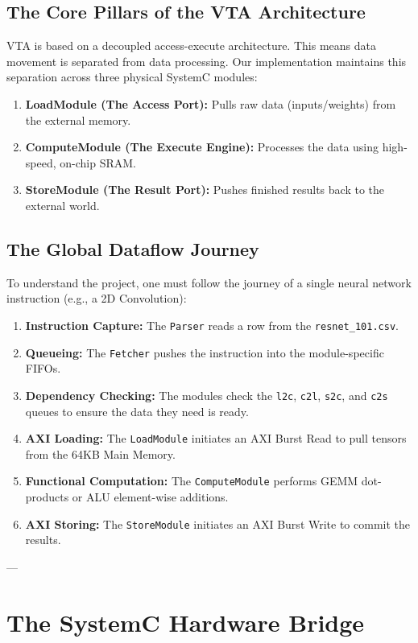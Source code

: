 \documentclass[11pt,a4paper]{report}
\begin{document}
\section{The Core Pillars of the VTA Architecture}
VTA is based on a decoupled access-execute architecture. This means data movement is separated from data processing. Our implementation maintains this separation across three physical SystemC modules:
\begin{enumerate}
    \item \textbf{LoadModule (The Access Port):} Pulls raw data (inputs/weights) from the external memory.
    \item \textbf{ComputeModule (The Execute Engine):} Processes the data using high-speed, on-chip SRAM.
    \item \textbf{StoreModule (The Result Port):} Pushes finished results back to the external world.
\end{enumerate}

\section{The Global Dataflow Journey}
To understand the project, one must follow the journey of a single neural network instruction (e.g., a 2D Convolution):
\begin{enumerate}[label=\alph*.]
    \item \textbf{Instruction Capture:} The \texttt{Parser} reads a row from the \texttt{resnet\_101.csv}.
    \item \textbf{Queueing:} The \texttt{Fetcher} pushes the instruction into the module-specific FIFOs.
    \item \textbf{Dependency Checking:} The modules check the \texttt{l2c}, \texttt{c2l}, \texttt{s2c}, and \texttt{c2s} queues to ensure the data they need is ready.
    \item \textbf{AXI Loading:} The \texttt{LoadModule} initiates an AXI Burst Read to pull tensors from the 64KB Main Memory.
    \item \textbf{Functional Computation:} The \texttt{ComputeModule} performs GEMM dot-products or ALU element-wise additions.
    \item \textbf{AXI Storing:} The \texttt{StoreModule} initiates an AXI Burst Write to commit the results.
\end{enumerate}

---

\chapter{The SystemC Hardware Bridge}
\end{document}
